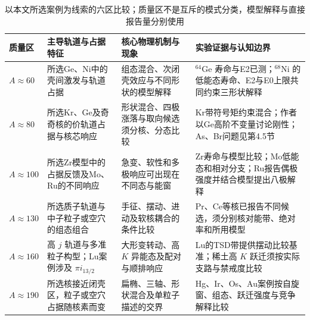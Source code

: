 \begin{table}[htbp]
\centering
\small
\setlength{\tabcolsep}{2.5pt}
\caption{以本文所选案例为线索的六区比较；质量区不是互斥的模式分类，模型解释与直接报告量分别使用}\label{tab:4-1-six-regions-framework}
\begin{tabularx}{\textwidth}{p{1.5cm}p{3.5cm}p{3.6cm}X}
\toprule
质量区 & 主导轨道与占据特征 & 核心物理机制与现象 & 实验证据与认知边界 \\
\midrule
$A \approx 60$ & 所选Ge、Ni中的壳间激发与轨道占据 & 组态混合、次闭壳效应与不同形状的模型解释 & $^{64}\mathrm{Ge}$ 寿命与E2已测；$^{68}\mathrm{Ni}$ 的低能态寿命、E2与E0上限共同约束三形状解释 \\
\addlinespace
$A \approx 80$ & 所选Kr、Ge及奇奇核的价轨道占据与核芯响应 & 形状混合、四极涨落与取向候选须分核、分态比较 & Kr带符号矩约束混合；作者以Ge高阶不变量讨论刚性；As、Br问题见第4.5节 \\
\addlinespace
$A \approx 100$ & 所选Zr模型中的占据反馈及Mo、Ru的不同响应 & 急变、软性和多极响应可出现在不同态与能窗 & Zr寿命与模型比较；Mo低能态和相对分支；Ru报告偶极强度并结合模型提出八极解释 \\
\addlinespace
$A \approx 130$ & 所选质子轨道与中子粒子或空穴的组态组合 & 手征、摆动、进动及软核耦合的条件比较 & Pr、Ce等核已报告不同候选，须分别核对能带、绝对率和所用模型 \\
\addlinespace
$A \approx 160$ & 高 $j$ 轨道与多准粒子构型；Lu案例涉及 $\pi i_{13/2}$ & 大形变转动、高 $K$ 异能态及配对与顺排响应 & Lu的TSD带提供摆动比较基准；稀土高 $K$ 跃迁须按实际支路与禁戒度比较 \\
\addlinespace
$A \approx 190$ & 所选核接近闭壳区，粒子或空穴占据随核素而变 & 扁椭、三轴、形状混合及单粒子描述的交界 & Hg、Ir、Os、Au案例按自旋窗、组态、跃迁强度与竞争解释比较 \\
\bottomrule
\end{tabularx}
\end{table}
